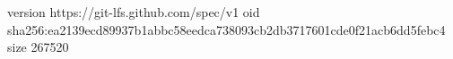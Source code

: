 version https://git-lfs.github.com/spec/v1
oid sha256:ea2139ecd89937b1abbc58eedca738093cb2db3717601cde0f21acb6dd5febc4
size 267520
